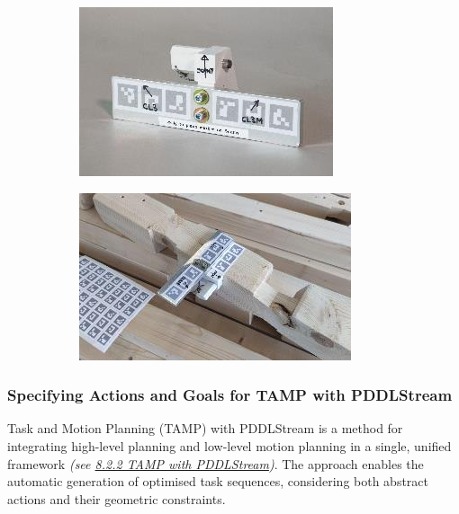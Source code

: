 \documentclass[11pt]{book}
\begin{document}
\begin{figure}[H]
\centering
\begin{subfigure}[b]{0.45\textwidth}
\centering
\includegraphics[width=\textwidth]{./images/image20.jpeg}
\end{subfigure}
\hfill
\begin{subfigure}[b]{0.45\textwidth}
\centering
\includegraphics[width=\textwidth]{./images/image21.jpeg}
\end{subfigure}
\end{figure}


\subsubsection{Specifying Actions and Goals for TAMP with PDDLStream}

Task and Motion Planning (TAMP) with PDDLStream is a method for integrating high-level planning and low-level motion planning in a single, unified framework \textit{(see \uline{8.2.2 TAMP with PDDLStream})}. The approach enables the automatic generation of optimised task sequences, considering both abstract actions and their geometric constraints. 
\end{document}
